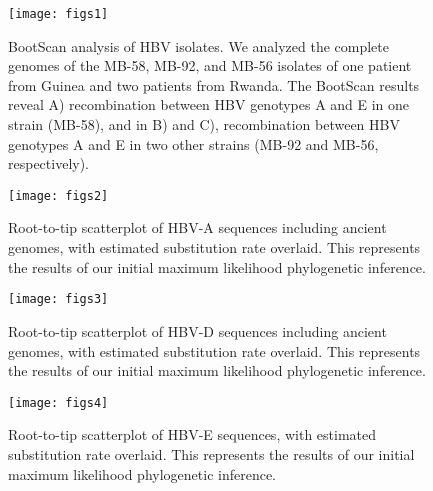 \begin{figure}[!htbp]%
    \centering
    \texttt{[image: figs1]}
    \caption[HBV BootScan results]{BootScan analysis of HBV isolates. We analyzed the complete genomes of the MB-58, MB-92, and MB-56 isolates of one patient from Guinea and two patients from Rwanda. The BootScan results reveal A) recombination between HBV genotypes A and E in one strain (MB-58), and in B) and C), recombination between HBV genotypes A and E in two other strains (MB-92 and MB-56, respectively).}
    \label{supfig:hbv-s1}
\end{figure}

\begin{figure}[!htbp]%
    \centering
    \texttt{[image: figs2]}
    \caption[HBV-A temporal signal analysis]{Root-to-tip scatterplot of HBV-A sequences including ancient genomes, with estimated substitution rate overlaid. This represents the results of our initial maximum likelihood phylogenetic inference.}
    \label{supfig:hbv-s2}
\end{figure}

\begin{figure}[!htbp]%
    \centering
    \texttt{[image: figs3]}
    \caption[HBV-D temporal signal analysis]{Root-to-tip scatterplot of HBV-D sequences including ancient genomes, with estimated substitution rate overlaid. This represents the results of our initial maximum likelihood phylogenetic inference.}
    \label{supfig:hbv-s3}
\end{figure}

\begin{figure}[!htbp]%
    \centering
    \texttt{[image: figs4]}
    \caption[HBV-E temporal signal analysis]{Root-to-tip scatterplot of HBV-E sequences, with estimated substitution rate overlaid. This represents the results of our initial maximum likelihood phylogenetic inference.}
    \label{supfig:hbv-sX}
\end{figure}

\cleardoublepage

